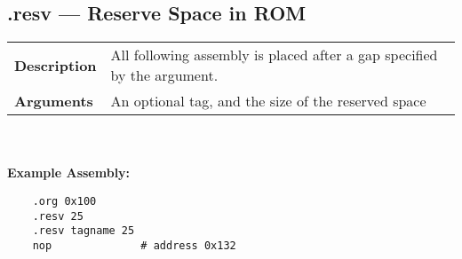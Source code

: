 \documentclass[titlepage]{article}
\begin{document}
\subsection{.resv --- Reserve Space in ROM}

\begin{tabular}{l p{8cm}}
{\bf Description} & All following assembly is placed after a gap specified by the argument. \\
{\bf Arguments} & An optional tag, and the size of the reserved space \\
\end{tabular}\\ \\
{\bf Example Assembly:}
\begin{verbatim}
    .org 0x100
    .resv 25
    .resv tagname 25
    nop              # address 0x132
\end{verbatim}
\end{document}

